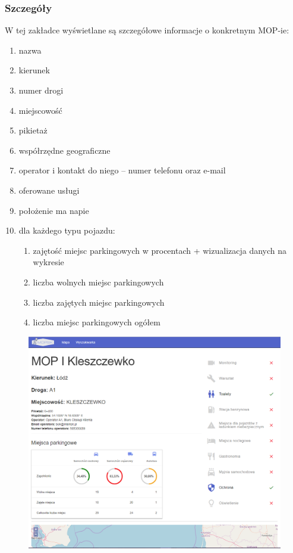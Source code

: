\subsubsection{Szczegóły}
W tej zakładce wyświetlane są szczegółowe informacje o konkretnym MOP-ie:
\begin{enumerate}
\item nazwa
\item kierunek
\item numer drogi
\item miejscowość
\item pikietaż
\item współrzędne geograficzne
\item operator i kontakt do niego -- numer telefonu oraz e-mail
\item oferowane usługi
\item położenie ma napie
\item dla każdego typu pojazdu:
\begin{enumerate}
\item zajętość miejsc parkingowych w procentach + wizualizacja danych na wykresie
\item liczba wolnych miejsc parkingowych
\item liczba zajętych miejsc parkingowych
\item liczba miejsc parkingowych ogółem
\end{enumerate}
\end{enumerate}

\begin{figure}[!htb]
\centering
\includegraphics[width=\textwidth]{images/mopsik_www/details1.png}
\label{mopsik_www_details}
\end{figure}

